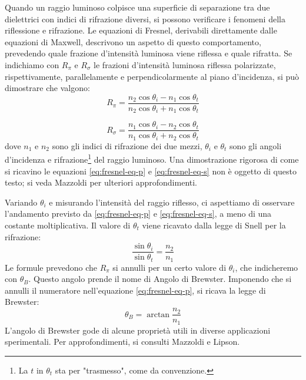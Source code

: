 Quando un raggio luminoso colpisce una superficie di separazione tra due
dielettrici con indici di rifrazione diversi, si possono verificare
i fenomeni della riflessione e rifrazione.
Le equazioni di Fresnel, derivabili direttamente dalle equazioni di Maxwell,
descrivono un aspetto di questo comportamento, prevedendo quale frazione d'intensità
luminosa viene riflessa e quale rifratta. Se indichiamo con $R_\pi$ e $R_\sigma$ le
frazioni d'intensità luminosa riflessa polarizzate, rispettivamente, parallelamente
e perpendicolarmente al piano d'incidenza, si può dimostrare che valgono:
%
\begin{equation}
  R_\pi = \frac {
    n_2 \cos{\theta_i} - n_1 \cos{\theta_t}
  } {
    n_2 \cos{\theta_i} + n_1 \cos{\theta_t}
  }\label{eq:fresnel-eq-p}
\end{equation}

\begin{equation}
  R_\sigma = \frac {
    n_1 \cos{\theta_i} - n_2 \cos{\theta_t}
  } {
    n_1 \cos{\theta_i} + n_2 \cos{\theta_t}
  }\label{eq:fresnel-eq-s}
\end{equation}
%
\noindent dove $n_1$ e $n_2$ sono gli indici di rifrazione dei due mezzi, $\theta_i$ e
$\theta_t$ sono gli angoli d'incidenza e rifrazione\footnote{La $t$ in $\theta_t$ sta per "trasmesso", come da convenzione.} del raggio luminoso.
Una dimostrazione rigorosa di come si ricavino le equazioni \eqref{eq:fresnel-eq-p} e \eqref{eq:fresnel-eq-s} non è oggetto
di questo testo;
si veda Mazzoldi\cite{mazzoldi98} per ulteriori approfondimenti.

Variando $\theta_i$ e misurando l’intensità del raggio riflesso,
ci aspettiamo di osservare l'andamento previsto da \eqref{eq:fresnel-eq-p} e \eqref{eq:fresnel-eq-s}, a meno di una
costante moltiplicativa.
Il valore di $\theta_t$ viene ricavato dalla legge di Snell per la rifrazione:
%
\begin{equation}
  \frac {\sin{\theta_i}} {\sin{\theta_t}} = \frac {n_2} {n_1}
  \label{eq:legge-snell}
\end{equation}
%
\noindent Le formule prevedono che $R_\pi$ si annulli per un certo valore di $\theta_i$,
che indicheremo con $\theta_B$.
Questo angolo prende il nome di Angolo di Brewster. Imponendo che si annulli il
numeratore nell'equazione \eqref{eq:fresnel-eq-p}, si ricava la legge di Brewster:
%
\begin{equation}
  \theta_B = \arctan{
    \frac {n_2} {n_1}
  }\label{eq:legge-brewster}
\end{equation}
%
\noindent  L’angolo di Brewster gode di alcune proprietà utili in diverse applicazioni
sperimentali.
Per approfondimenti, si consulti Mazzoldi\cite{mazzoldi98} e Lipson\cite{lipson20}.
\endinput
